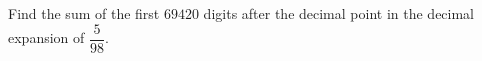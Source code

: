 Find the sum of the first $69420$ digits after the decimal point in the decimal expansion of $\dfrac{5}{98}$.
